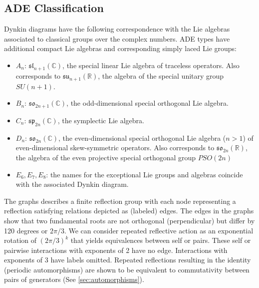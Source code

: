 \documentclass{article}
\theoremstyle{definition}
\begin{document}
\subsection{ADE Classification}
\label{sec:ade}
Dynkin diagrams have the following correspondence with the Lie algebras associated to classical groups over the complex numbers. ADE types have additional compact Lie algebras and corresponding simply laced Lie groups:
\begin{itemize}
    \item $A_{n}$: ${\mathfrak{sl}}_{{n+1}}(\mathbb{C})$, the special linear Lie algebra of traceless operators. Also corresponds to $\mathfrak{su}_{n+1}(\mathbb{R})$, the algebra of the special unitary group $SU(n+1)$.
    \item $B_{n}$: ${\mathfrak  {so}}_{{2n+1}}(\mathbb{C})$, the odd-dimensional special orthogonal Lie algebra.
    \item  $C_{n}$: ${\mathfrak  {sp}}_{{2n}}(\mathbb{C})$, the symplectic Lie algebra.
    \item $D_{n}$: ${\mathfrak  {so}}_{{2n}}(\mathbb{C})$, the even-dimensional special orthogonal Lie algebra ($n>1$) of even-dimensional skew-symmetric operators. Also corresponds to $\mathfrak{so}_{2n}(\mathbb{R})$, the algebra of the even projective special orthogonal group $PSO(2n)$
    \item $E_6, E_7, E_8$: the names for  the exceptional Lie groups and algebras coincide with the associated Dynkin diagram.
\end{itemize}




The graphs describes a finite reflection group with each node representing a reflection satisfying relations depicted as (labeled) edges.
The edges in the graphs show that two fundamental roots are not orthogonal (perpendicular) but differ by 120 degrees or $2\pi/3$.
We can consider repeated reflective action as an exponential rotation of $(2 \pi /3)^k$ that yields equivalences between self or pairs. These self or pairwise interactions with exponents of 2 have no edge. Interactions with exponents of 3 have labels omitted. 
Repeated reflections resulting in the identity (periodic automorphisms) are shown to be equivalent to commutativity between pairs of generators (See \cref{sec:automorphisms}).
\end{document}
